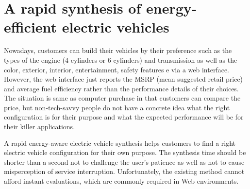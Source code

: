 \documentclass[journal]{IEEEtran}
\begin{document}
\section{A rapid synthesis of energy-efficient electric vehicles}

Nowadays, customers can build  their  vehicles by their preference such as the types of the engine (4 cylinders or 6 cylinders) and transmission as well as the color, exterior, interior, entertainment, safety features e via a web interface. However, the web interface  just reports  the MSRP (mean suggested retail price) and average fuel efficiency rather than the performance details of their choices. The situation is same as computer purchase in that customers can compare the price, but non-tech-savvy people do not have a concrete idea what the right configuration is for their purpose and what the expected performance will be for their killer applications. 

A rapid energy-aware electric vehicle synthesis helps customers to find a right electric vehicle configuration for their own purpose. The synthesis time should be shorter than a second not to challenge the user’s patience as well as not to cause misperception of service interruption. Unfortunately, the existing method cannot afford instant evaluations, which are commonly required in Web environments. 
\end{document}
